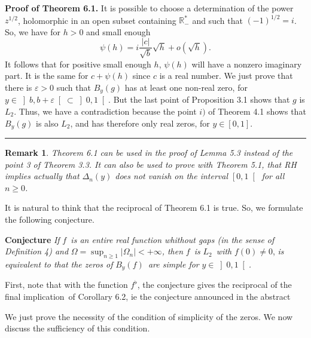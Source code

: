 \documentclass{article}
\newtheorem{remark}{Remark}
\newenvironment{proof}[1][Proof]{\textbf{#1.} }{\ \rule{0.5em}{0.5em}}
\begin{document}
\begin{proof}[Proof of Theorem 6.1]
It is possible to choose a determination of the power $z^{1/2}$, holomorphic
in an open subset containing $\mathbb{R}_{-}^{\ast }$ and such that $\left(
-1\right) ^{1/2}=i$. So, we have for $h>0$ and small enough 
\begin{equation*}
\psi \left( h\right) =i\dfrac{\left| c\right| }{\sqrt{b}}\sqrt{h}+o\left( 
\sqrt{h}\right) \text{.}
\end{equation*}
It follows that for positive small enough $h$, $\psi \left( h\right) $ will
have a nonzero imaginary part. It is the same for $c+\psi \left( h\right) $
since $c$ is a real number. We just prove that there is $\varepsilon >0$
such that $B_{y}\left( g\right) $ has at least one non-real zero, for $y\in 
\left] b,b+\varepsilon \right[ \subset \left] 0,1\right[ $. But the last
point of Proposition 3.1 shows that $g$ is $L_{2}$. Thus, we have a
contradiction because the point $i)$ of Theorem 4.1 shows that $B_{y}\left(
g\right) $ is also $L_{2}$, and has therefore only real zeros, for $y\in 
\left[ 0,1\right] $.
\end{proof}

\begin{remark}
\bigskip Theorem 6.1 can be used in the proof of Lemma 5.3 instead of the
point 3 of Theorem 3.3. It can also be used to prove with Theorem 5.1, that
RH implies actually that $\Delta _{n}\left( y\right) $ does not vanish on
the interval $\left[ 0,1\right[ $ for all $n\geq 0$.
\end{remark}

It is natural to think that the reciprocal of Theorem 6.1 is true. So, we
formulate the following conjecture.

\bigskip

\textbf{Conjecture} \textit{If }$f$\textit{\ is an entire real function
whithout gaps (in the sense of Definition 4) and }$\Omega =\sup_{n\geq
1}\left| \Omega _{n}\right| <+\infty $\textit{, then }$f$\textit{\ is }$L_{2} $\textit{\ with }$f\left( 0\right) \neq 0$, \textit{is equivalent to
that the zeros of }$B_{y}\left( f\right) $\textit{\ are simple for }$y\in \left] 0,1\right[ $\textit{.}

\bigskip

First, note that with the function $f^{\flat }$, the conjecture gives the
reciprocal of the final implication\ of Corollary 6.2, ie the conjecture
announced in the abstract

We just prove the necessity of the condition of simplicity of the zeros. We
now discuss the sufficiency of this condition.
\end{document}
